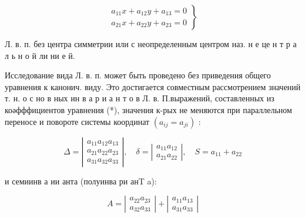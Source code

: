 \documentclass[10pt]{article}
\begin{document}
\[

\left.\begin{array}{l}

a_{11} x+a_{12} y+a_{13}=0 \\

a_{21} x+a_{22} y+a_{23}=0

\end{array}\right\}

\]



Л. в. п. без центра симметрии или с неопределенным центром наз. н е це н т р а л ь н о й ли ни е й.



Исследование вида Л. в. п. может быть проведено без приведения общего уравнения к канонич. виду. Это достигается совместным рассмотрением значений т. н. о с но в ных ин в а р и а н т о в Л. в. П.выражений, составленных из коәфффициентов уравнения (*), значения к-рых не меняются при параллельном переносе и повороте системы координат $\left(a_{i j}=a_{j i}\right)$ :



\[

\Delta=\left|\begin{array}{l}

a_{11} a_{12} a_{13} \\

a_{21} a_{22} a_{23} \\

a_{31} a_{32} a_{33}

\end{array}\right|, \quad \delta=\left|\begin{array}{l}

a_{11} a_{12} \\

a_{21} a_{22}

\end{array}\right|, \quad S=a_{11}+a_{22}

\]



и семиинв а ии анта (полуинва ри анT a):



\[

A=\left|\begin{array}{l}

a_{22} a_{23} \\

a_{32} a_{33}

\end{array}\right|+\left|\begin{array}{l}

a_{11} a_{13} \\

a_{31} a_{33}

\end{array}\right|

\]
\end{document}
